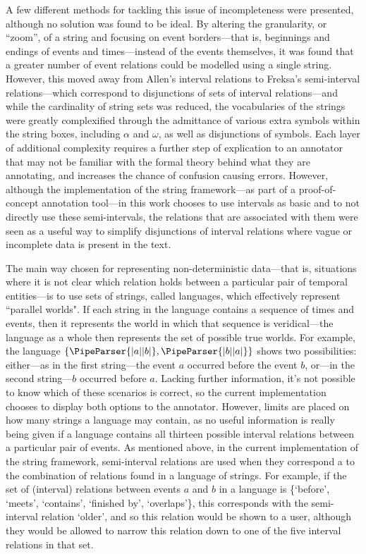 \documentclass[a4paper,12pt,leqno]{article}
\newcommand{\vph}[1]{\vphantom{#1}}
\newcommand{\ebox}[1]{\fbox{$\vph{'(),}#1$}}
\newcommand{\EventString}[1]{%
	\renewcommand*{\do}[1]{\ebox{##1}}%
	\PipeParser{#1}%
}
\begin{document}
A few different methods for tackling this issue of incompleteness were presented, although no solution was found to be ideal. By altering the granularity, or ``zoom'', of a string and focusing on event borders---that is, beginnings and endings of events and times---instead of the events themselves, it was found that a greater number of event relations could be modelled using a single string. However, this moved away from Allen's interval relations to Freksa's semi-interval relations---which correspond to disjunctions of sets of interval relations---and while the cardinality of string sets was reduced, the vocabularies of the strings were greatly complexified through the admittance of various extra symbols within the string boxes, including $\alpha$ and $\omega$, as well as disjunctions of symbols. Each layer of additional complexity requires a further step of explication to an annotator that may not be familiar with the formal theory behind what they are annotating, and increases the chance of confusion causing errors. However, although the implementation of the string framework---as part of a proof-of-concept annotation tool---in this work chooses to use intervals as basic and to not directly use these semi-intervals, the relations that are associated with them were seen as a useful way to simplify disjunctions of interval relations where vague or incomplete data is present in the text.

The main way chosen for representing non-deterministic data---that is, situations where it is not clear which relation holds between a particular pair of temporal entities---is to use sets of strings, called languages, which effectively represent ``parallel worlds". If each string in the language contains a sequence of times and events, then it represents the world in which that sequence is veridical---the language as a whole then represents the set of possible true worlds. For example, the language $\{\EventString{{}|a|{}|b|{}}, \EventString{{}|b|{}|a|{}}\}$ shows two possibilities: either---as in the first string---the event $a$ occurred before the event $b$, or---in the second string---$b$ occurred before $a$. Lacking further information, it's not possible to know which of these scenarios is correct, so the current implementation chooses to display both options to the annotator. However, limits are placed on how many strings a language may contain, as no useful information is really being given if a language contains all thirteen possible interval relations between a particular pair of events. As mentioned above, in the current implementation of the string framework, semi-interval relations are used when they correspond a to the combination of relations found in a language of strings. For example, if the set of (interval) relations between events $a$ and $b$ in a language is \{`before', `meets', `contains', `finished by', `overlaps'\}, this corresponds with the semi-interval relation `older', and so this relation would be shown to a user, although they would be allowed to narrow this relation down to one of the five interval relations in that set.
\end{document}
